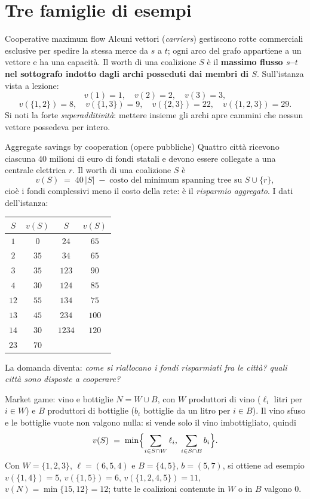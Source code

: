 \documentclass[12pt,a4paper,twoside]{book}
\theoremstyle{plain}
\theoremstyle{definition}
\begin{document}
\section{Tre famiglie di esempi}

\begin{exbox}{Cooperative maximum flow}
Alcuni vettori (\textit{carriers}) gestiscono rotte commerciali esclusive per
spedire la stessa merce da $s$ a $t$; ogni arco del grafo appartiene a un vettore
e ha una capacità. Il worth di una coalizione $S$ è il \textbf{massimo flusso
$s$--$t$ nel sottografo indotto dagli archi posseduti dai membri di $S$}.
Sull'istanza vista a lezione:
\[
  v(1)=1,\quad v(2)=2,\quad v(3)=3,
\]
\[
  v(\{1,2\})=8,\quad v(\{1,3\})=9,\quad v(\{2,3\})=22,\quad v(\{1,2,3\})=29 .
\]
Si noti la forte \emph{superadditività}: mettere insieme gli archi apre cammini
che nessun vettore possedeva per intero.
\end{exbox}

\begin{exbox}{Aggregate savings by cooperation (opere pubbliche)}
Quattro città ricevono ciascuna 40 milioni di euro di fondi statali e devono essere
collegate a una centrale elettrica $r$. Il worth di una coalizione $S$ è
\[
  v(S)\;=\;40\,|S|\;-\;\text{costo del minimum spanning tree su } S\cup\{r\},
\]
cioè i fondi complessivi meno il costo della rete: è il \emph{risparmio
aggregato}. I dati dell'istanza:
\begin{center}
\begin{tabular}{cc@{\qquad}cc}
\toprule
$S$ & $v(S)$ & $S$ & $v(S)$\\
\midrule
$1$ & $0$   & $24$   & $65$\\
$2$ & $35$  & $34$   & $65$\\
$3$ & $35$  & $123$  & $90$\\
$4$ & $30$  & $124$  & $85$\\
$12$& $55$  & $134$  & $75$\\
$13$& $45$  & $234$  & $100$\\
$14$& $30$  & $1234$ & $120$\\
$23$& $70$  &        & \\
\bottomrule
\end{tabular}
\end{center}
La domanda diventa: \emph{come si riallocano i fondi risparmiati fra le città?
quali città sono disposte a cooperare?}
\end{exbox}

\begin{exbox}{Market game: vino e bottiglie}
$N=W\cup B$, con $W$ produttori di vino ($\ell_i$ litri per $i\in W$) e $B$
produttori di bottiglie ($b_i$ bottiglie da un litro per $i\in B$). Il vino
sfuso e le bottiglie vuote non valgono nulla: si vende solo il vino
imbottigliato, quindi
\[
  v(S)\;=\;\min\Bigl\{\sum_{i\in S\cap W}\ell_i,\;\sum_{i\in S\cap B}b_i\Bigr\}.
\]
Con $W=\{1,2,3\}$, $\ell=(6,5,4)$ e $B=\{4,5\}$, $b=(5,7)$, si ottiene ad esempio
$v(\{1,4\})=5$, $v(\{1,5\})=6$, $v(\{1,2,4,5\})=11$, $v(N)=\min\{15,12\}=12$;
tutte le coalizioni contenute in $W$ o in $B$ valgono $0$.
\end{exbox}
\end{document}

